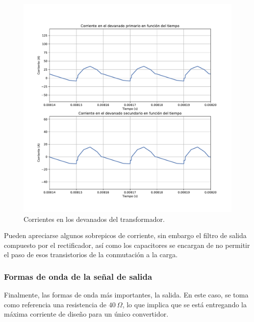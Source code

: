 \begin{figure}
	\centering
	\includegraphics[width=1\linewidth]{../corrientes_transformador}
	\caption{Corrientes en los devanados del transformador.}
	\label{fig:corrientestransformador}
\end{figure}

Pueden apreciarse algunos sobrepicos de corriente, sin embargo el filtro de salida compuesto por el rectificador, así como los capacitores se encargan de no permitir el paso de esos transistorios de la conmutación a la carga.


\subsubsection{Formas de onda de la señal de salida}

Finalmente, las formas de onda más importantes, la salida. En este caso, se toma como referencia una resistencia de $40 \ \Omega$, lo que implica que se está entregando la máxima corriente de diseño para un único convertidor.


